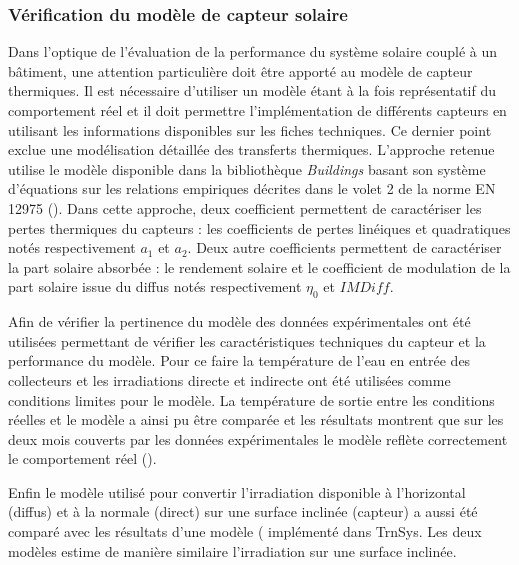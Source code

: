 \subsubsection{Vérification du modèle de capteur solaire} %
\label{ssub:verification_du_modele_de_capteur_solaire}
Dans l’optique de l’évaluation de la performance  du système solaire couplé à un bâtiment, une
attention particulière doit être apporté au modèle de capteur thermiques. Il est
nécessaire d’utiliser un modèle étant à la fois représentatif du comportement réel
et il doit permettre l’implémentation de différents capteurs en utilisant les informations
disponibles sur les fiches techniques. Ce dernier point exclue une modélisation détaillée
des transferts thermiques. L’approche retenue utilise le modèle disponible dans la
bibliothèque \textit{Buildings} basant son système d’équations sur les relations
empiriques décrites dans le volet 2 de la norme EN\,12975 ().
Dans cette approche, deux coefficient
permettent de caractériser les pertes thermiques du capteurs : les coefficients de pertes linéiques
et quadratiques notés respectivement $a_{1}$ et $a_{2}$. Deux autre coefficients permettent de
caractériser la part solaire absorbée :  le rendement solaire et le coefficient de modulation
de la part solaire issue du diffus notés respectivement $\eta_{0}$ et $IMDiff$.

Afin de vérifier la pertinence du modèle des données expérimentales ont été utilisées
permettant de vérifier les caractéristiques techniques du capteur et la performance du
modèle. Pour ce faire la température de l’eau en entrée des collecteurs et les
irradiations directe et indirecte ont été utilisées comme conditions limites pour le
modèle. La température de sortie entre les conditions réelles et le modèle a ainsi
pu être comparée et les résultats montrent que sur les deux mois couverts par les données
expérimentales le modèle reflète correctement le comportement réel ().

Enfin le modèle utilisé pour convertir l’irradiation disponible à l’horizontal (diffus)
et à la normale (direct) sur une surface inclinée (capteur) a aussi été comparé
avec les résultats d’une modèle ( implémenté dans TrnSys. Les deux
modèles estime de manière similaire l’irradiation sur une surface inclinée.



